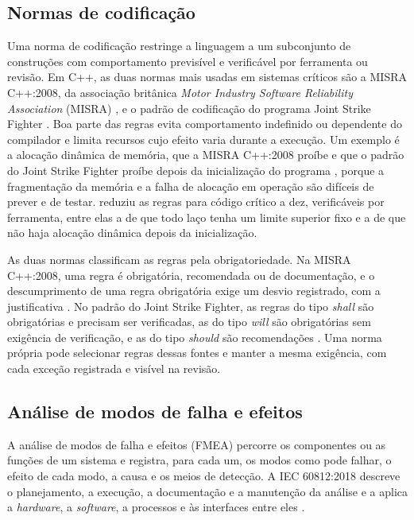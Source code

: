 \subsection{Normas de codificação}\label{sec:fund-norma-codigo}

Uma norma de codificação restringe a linguagem a um subconjunto de construções com comportamento previsível e verificável por ferramenta ou revisão. Em C++, as duas normas mais usadas em sistemas críticos são a MISRA C++:2008, da associação britânica \textit{Motor Industry Software Reliability Association} (MISRA) \cite{misra2008}, e o padrão de codificação do programa Joint Strike Fighter \cite{jsf2005}. Boa parte das regras evita comportamento indefinido ou dependente do compilador e limita recursos cujo efeito varia durante a execução. Um exemplo é a alocação dinâmica de memória, que a MISRA C++:2008 proíbe \cite{misra2008} e que o padrão do Joint Strike Fighter proíbe depois da inicialização do programa \cite{jsf2005}, porque a fragmentação da memória e a falha de alocação em operação são difíceis de prever e de testar.  reduziu as regras para código crítico a dez, verificáveis por ferramenta, entre elas a de que todo laço tenha um limite superior fixo e a de que não haja alocação dinâmica depois da inicialização.

As duas normas classificam as regras pela obrigatoriedade. Na MISRA C++:2008, uma regra é obrigatória, recomendada ou de documentação, e o descumprimento de uma regra obrigatória exige um desvio registrado, com a justificativa \cite{misra2008}. No padrão do Joint Strike Fighter, as regras do tipo \textit{shall} são obrigatórias e precisam ser verificadas, as do tipo \textit{will} são obrigatórias sem exigência de verificação, e as do tipo \textit{should} são recomendações \cite{jsf2005}. Uma norma própria pode selecionar regras dessas fontes e manter a mesma exigência, com cada exceção registrada e visível na revisão.

\subsection{Análise de modos de falha e efeitos}\label{sec:fund-fmea}

A análise de modos de falha e efeitos (FMEA) percorre os componentes ou as funções de um sistema e registra, para cada um, os modos como pode falhar, o efeito de cada modo, a causa e os meios de detecção. A IEC 60812:2018 descreve o planejamento, a execução, a documentação e a manutenção da análise e a aplica a \textit{hardware}, a \textit{software}, a processos e às interfaces entre eles \cite{iec60812}.

